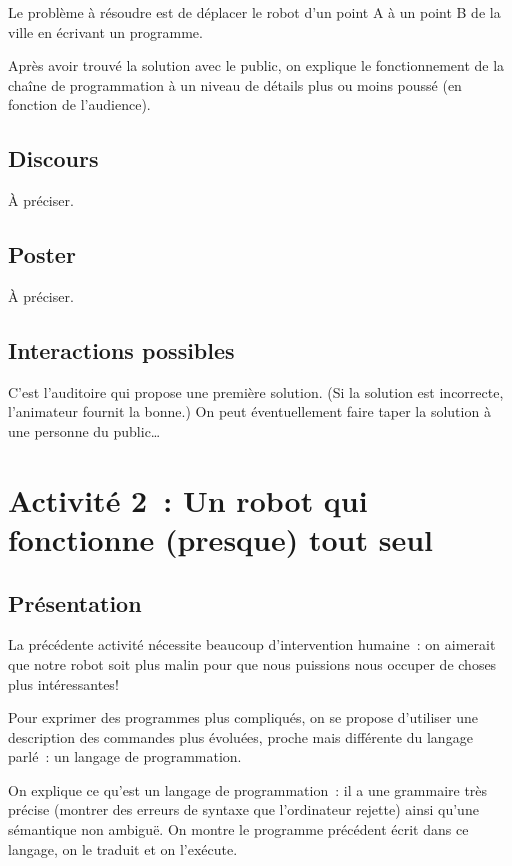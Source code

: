 \documentclass[11pt,a4paper]{article}
\begin{document}
Le problème à résoudre est de déplacer le robot d'un point A à un
point B de la ville en écrivant un programme. 

Après avoir trouvé la solution avec le public, on explique le
fonctionnement de la chaîne de programmation à un niveau de détails
plus ou moins poussé (en fonction de l'audience).

\subsection{Discours}

À préciser. 

\subsection{Poster}

À préciser. 

\subsection{Interactions possibles}

C'est l'auditoire qui propose une première solution. (Si la solution
est incorrecte, l'animateur fournit la bonne.) On peut éventuellement
faire taper la solution à une personne du public\ldots

\newpage
\section{Activité 2~: Un robot qui fonctionne (presque) tout seul}
\label{sec:act2}

\subsection{Présentation}

La précédente activité nécessite beaucoup d'intervention humaine~: on
aimerait que notre robot soit plus malin pour que nous puissions nous
occuper de choses plus intéressantes!

Pour exprimer des programmes plus compliqués, on se propose d'utiliser
une description des commandes plus évoluées, proche mais différente du
langage parlé~: un langage de programmation. 

On explique ce qu'est un langage de programmation~: il a une grammaire très
précise (montrer des erreurs de syntaxe que l'ordinateur rejette) ainsi qu'une
sémantique non ambiguë. On montre le programme précédent écrit dans
ce langage, on le traduit et on l'exécute. 
\end{document}
